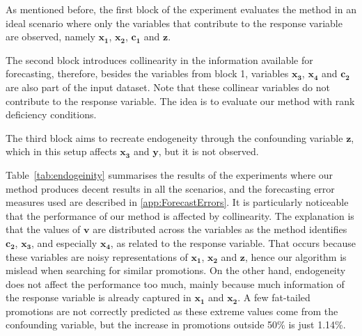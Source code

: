 \documentclass{ieeeaccess}
\begin{document}
As mentioned before, the first block of the experiment evaluates the method in an ideal scenario where only the variables that contribute to the response variable are observed, namely $\mathbf{x_1}$, $\mathbf{x_2}$, $\mathbf{c_1}$ and $\mathbf{z}$. 

The second block introduces collinearity in the information available for forecasting, therefore, besides the variables from block 1, variables $\mathbf{x_3}$, $\mathbf{x_4}$ and $\mathbf{c_2}$ are also part of the input dataset. Note that these collinear variables do not contribute to the response variable. The idea is to evaluate our method with rank deficiency conditions.

The third block aims to recreate endogeneity through the confounding variable $\mathbf{z}$, which in this setup affects $\mathbf{x_3}$ and $\mathbf{y}$, but it is not observed.

Table~\ref{tab:endogeinity} summarises the results of the experiments where our method produces decent results in all the scenarios, and the forecasting error measures used are described in \ref{app:ForecastErrors}. It is particularly noticeable that the performance of our method is affected by collinearity. The explanation is that the values of $\mathbf{v}$ are distributed across the variables as the method identifies $\mathbf{c_2}$, $\mathbf{x_3}$, and especially $\mathbf{x_4}$, as related to the response variable. That occurs because these variables are noisy representations of $\mathbf{x_1}$, $\mathbf{x_2}$ and $\mathbf{z}$, hence our algorithm is mislead when searching for similar promotions. On the other hand, endogeneity does not affect the performance too much, mainly because much information of the response variable is already captured in $\mathbf{x_1}$ and $\mathbf{x_2}$. A few fat-tailed promotions are not correctly predicted as these extreme values come from the confounding variable, but the increase in promotions outside 50\% is just 1.14\%.
\end{document}
